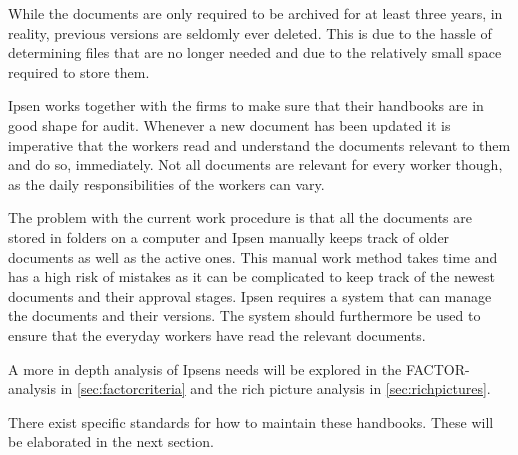 While the documents are only required to be archived for at least three years, in reality, previous versions are seldomly ever deleted.
This is due to the hassle of determining files that are no longer needed and due to the relatively small space required to store them.

Ipsen works together with the firms to make sure that their handbooks are in good shape for audit.
Whenever a new document has been updated it is imperative that the workers read and understand the documents relevant to them and do so, immediately.
Not all documents are relevant for every worker though, as the daily responsibilities of the workers can vary.

The problem with the current work procedure is that all the documents are stored in folders on a computer and Ipsen manually keeps track of older documents as well as the active ones.
This manual work method takes time and has a high risk of mistakes as it can be complicated to keep track of the newest documents and their approval stages.
Ipsen requires a system that can manage the documents and their versions.
The system should furthermore be used to ensure that the everyday workers have read the relevant documents.

A more in depth analysis of Ipsens needs will be explored in the FACTOR-analysis in \cref{sec:factorcriteria} and the rich picture analysis in \cref{sec:richpictures}.

There exist specific standards for how to maintain these handbooks.
These will be elaborated in the next section.
